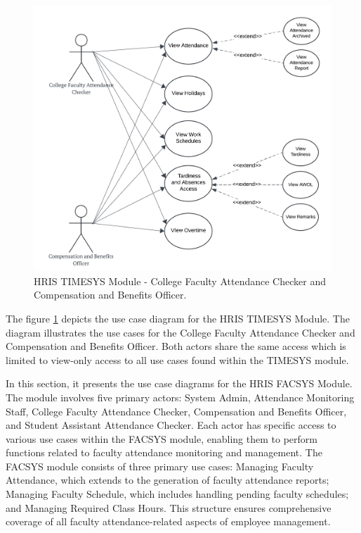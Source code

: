     \begin{figure}[H]
        \centering
        \includegraphics[width=0.9\linewidth]{figures/images/diagrams/usecase/use-case-time-2.png}
        \caption{HRIS TIMESYS Module - College Faculty Attendance Checker and Compensation and Benefits Officer.}
        \label{fig:use-case-time-2}
    \end{figure}

    The figure \ref{fig:use-case-time-2} depicts the use case diagram for the HRIS TIMESYS Module. The diagram illustrates the use cases for the College Faculty Attendance Checker and Compensation and Benefits Officer. Both actors share the same access which is limited to view-only access to all use cases found within the TIMESYS module. 


    In this section, it presents the use case diagrams for the HRIS FACSYS Module. The module involves five primary actors: System Admin, Attendance Monitoring Staff, College Faculty Attendance Checker, Compensation and Benefits Officer, and Student Assistant Attendance Checker. Each actor has specific access to various use cases within the FACSYS module, enabling them to perform functions related to faculty attendance monitoring and management. The FACSYS module consists of three primary use cases: Managing Faculty Attendance, which extends to the generation of faculty attendance reports; Managing Faculty Schedule, which includes handling pending faculty schedules; and Managing Required Class Hours. This structure ensures comprehensive coverage of all faculty attendance-related aspects of employee management.

